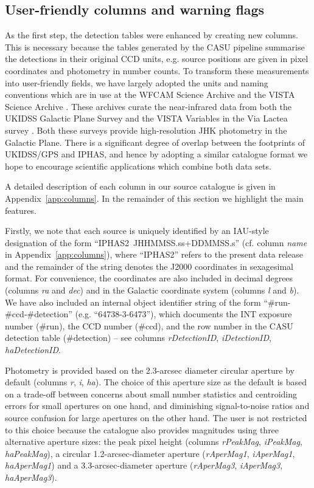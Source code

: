 \documentclass[useAMS,usenatbib]{mn2e}
\begin{document}
\subsection{User-friendly columns and warning flags}

As the first step, the detection tables 
were enhanced by creating new columns.
This is necessary because the tables 
generated by the CASU pipeline 
summarise the detections 
in their original CCD units,
e.g. source positions are given in pixel coordinates 
and photometry in number counts.
To transform these measurements into
user-friendly fields,
we have largely adopted the units and naming conventions
which are in use at the 
WFCAM Science Archive \citep[WSA;][]{Hambly2008}
and the VISTA Science Archive \citep[VSA;][]{Cross2012}.
These archives curate the near-infrared data from both
the UKIDSS Galactic Plane Survey \citep[GPS;][]{Lucas2008}
and the 
VISTA Variables in the Via Lactea survey \cite[VVV;][]{Minniti2010}.
Both these surveys provide high-resolution JHK photometry
in the Galactic Plane.
There is a significant degree of overlap
between the footprints of UKIDSS/GPS and IPHAS,
and hence by adopting a similar catalogue format
we hope to encourage scientific applications
which combine both data sets.

A detailed description of each column in our source catalogue
is given in Appendix~\ref{app:columns}.
In the remainder of this section we highlight the main features.

Firstly, we note that each source is uniquely identified by an
IAU-style designation of the form ``IPHAS2\ JHHMMSS.ss+DDMMSS.s''
(cf. column \emph{name} in Appendix~\ref{app:columns}),
where ``IPHAS2'' refers to the present
data release and the remainder of the string
denotes the J2000 coordinates in sexagesimal format.
For convenience, the coordinates
are also included in decimal degrees
(columns \emph{ra} and \emph{dec})
and in the Galactic coordinate system
(columns \emph{l} and \emph{b}).
We have also included an internal object identifier string 
of the form ``\#run-\#ccd-\#detection''
(e.g. ``64738-3-6473''),
which documents the INT exposure number (\#run),
the CCD number (\#ccd),
and the row number in the CASU detection table (\#detection)
-- see columns \emph{rDetectionID},
\emph{iDetectionID}, \emph{haDetectionID}.

Photometry is provided based on the 2.3-arcsec diameter circular aperture
by default (columns \emph{r}, \emph{i}, \emph{ha}).
The choice of this aperture size as the default 
is based on a trade-off between concerns 
about small number statistics and centroiding errors
for small apertures on one hand,
and diminishing signal-to-noise ratios and source confusion
for large apertures on the other hand.
The user is not restricted to this choice because
the catalogue also provides magnitudes
using three alternative aperture sizes:
the peak pixel height 
(columns \emph{rPeakMag}, \emph{iPeakMag}, \emph{haPeakMag}),
a circular 1.2-arcsec-diameter aperture 
(\emph{rAperMag1}, \emph{iAperMag1},
 \emph{haAperMag1}) and
a 3.3-arcsec-diameter aperture 
(\emph{rAperMag3}, \emph{iAperMag3},
 \emph{haAperMag3}).
\end{document}

